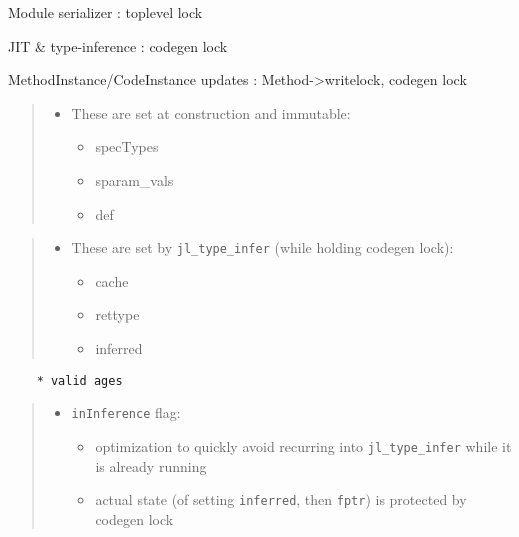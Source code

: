 Module serializer : toplevel lock



JIT \& type-inference : codegen lock



MethodInstance/CodeInstance updates : Method->writelock, codegen lock



\begin{quote}
\begin{itemize}
\item These are set at construction and immutable:

\begin{itemize}
\item specTypes


\item sparam\_vals


\item def

\end{itemize}
\end{itemize}
\end{quote}


\begin{quote}
\begin{itemize}
\item These are set by \texttt{jl\_type\_infer} (while holding codegen lock):

\begin{itemize}
\item cache


\item rettype


\item inferred

\end{itemize}
\end{itemize}
\end{quote}



\begin{lstlisting}
    * valid ages
\end{lstlisting}



\begin{quote}
\begin{itemize}
\item \texttt{inInference} flag:

\begin{itemize}
\item optimization to quickly avoid recurring into \texttt{jl\_type\_infer} while it is already running


\item actual state (of setting \texttt{inferred}, then \texttt{fptr}) is protected by codegen lock

\end{itemize}
\end{itemize}
\end{quote}


